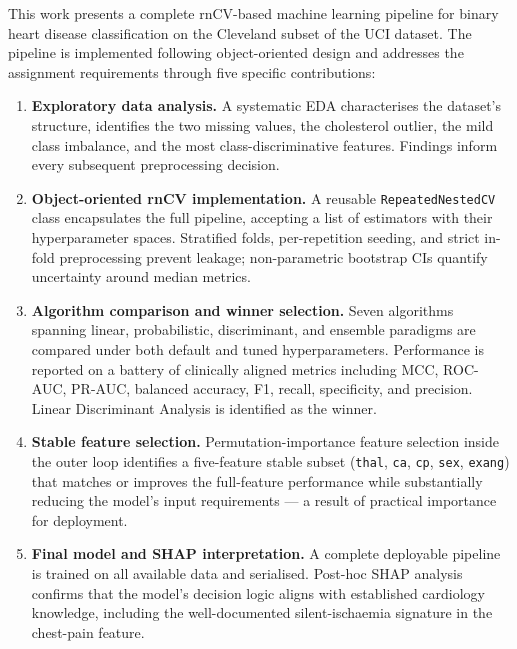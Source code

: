 This work presents a complete rnCV-based machine learning pipeline for binary heart disease classification on the Cleveland subset of the UCI dataset. The pipeline is implemented following object-oriented design and addresses the assignment requirements through five specific contributions:

\begin{enumerate}
    \item \textbf{Exploratory data analysis.} A systematic EDA characterises the dataset's structure, identifies the two missing values, the cholesterol outlier, the mild class imbalance, and the most class-discriminative features. Findings inform every subsequent preprocessing decision.

    \item \textbf{Object-oriented rnCV implementation.} A reusable \texttt{RepeatedNestedCV} class encapsulates the full pipeline, accepting a list of estimators with their hyperparameter spaces. Stratified folds, per-repetition seeding, and strict in-fold preprocessing prevent leakage; non-parametric bootstrap CIs quantify uncertainty around median metrics.

    \item \textbf{Algorithm comparison and winner selection.} Seven algorithms spanning linear, probabilistic, discriminant, and ensemble paradigms are compared under both default and tuned hyperparameters. Performance is reported on a battery of clinically aligned metrics including MCC, ROC-AUC, PR-AUC, balanced accuracy, F1, recall, specificity, and precision. Linear Discriminant Analysis is identified as the winner.

    \item \textbf{Stable feature selection.} Permutation-importance feature selection inside the outer loop identifies a five-feature stable subset (\texttt{thal}, \texttt{ca}, \texttt{cp}, \texttt{sex}, \texttt{exang}) that matches or improves the full-feature performance while substantially reducing the model's input requirements --- a result of practical importance for deployment.

    \item \textbf{Final model and SHAP interpretation.} A complete deployable pipeline is trained on all available data and serialised. Post-hoc SHAP analysis~\cite{lundberg2017unified} confirms that the model's decision logic aligns with established cardiology knowledge, including the well-documented silent-ischaemia signature in the chest-pain feature.
\end{enumerate}

